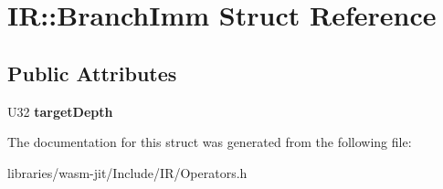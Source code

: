 \hypertarget{struct_i_r_1_1_branch_imm}{}\section{IR\+:\+:Branch\+Imm Struct Reference}
\label{struct_i_r_1_1_branch_imm}
\subsection*{Public Attributes}
\begin{DoxyCompactItemize}
\item 
\mbox{\label{struct_i_r_1_1_branch_imm_a593815bfc84d3b4ba4f7bd74efe99e19}} 
U32 {\bfseries target\+Depth}
\end{DoxyCompactItemize}


The documentation for this struct was generated from the following file\+:\begin{DoxyCompactItemize}
\item 
libraries/wasm-\/jit/\+Include/\+I\+R/Operators.\+h\end{DoxyCompactItemize}
